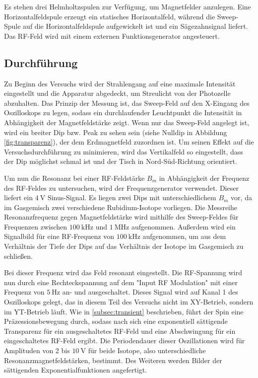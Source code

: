   Es stehen drei Helmholtzspulen zur Verfügung, um Magnetfelder anzulegen. Eine Horizontalfeldspule erzeugt ein statisches Horizontalfeld, während die Sweep-Spule auf die Horizontalfeldspule aufgewickelt ist und ein Sägezahnsignal liefert. Das RF-Feld wird mit einem externen Funktionsgenerator angesteuert.

  \subsection{Durchführung}

  Zu Beginn des Versuchs wird der Strahlengang auf eine maximale Intensität eingestellt und die Apparatur abgedeckt, um Streulicht von der Photozelle abzuhalten.
  Das Prinzip der Messung ist, das Sweep-Feld auf den X-Eingang des Oszilloskops zu legen, sodass ein durchlaufender Leuchtpunkt die Intensität in Abhängigkeit der Magnetfeldstärke zeigt.
  Wenn nur das Sweep-Feld angelegt ist, wird ein breiter Dip bzw. Peak zu sehen sein (siehe Nulldip in Abbildung \ref{fig:transparenz}), der dem Erdmagnetfeld zuzordnen ist. Um seinen Effekt auf die Versuchsdurchführung zu minimieren, wird das Vertikalfeld so eingestellt, dass der Dip möglichst schmal ist und der Tisch in Nord-Süd-Richtung orientiert.

  Um nun die Resonanz bei einer RF-Feldstärke $B_m$ in Abhängigkeit der Frequenz des RF-Feldes zu untersuchen, wird der Frequenzgenerator verwendet. Dieser liefert ein $\SI{4}{\volt}$ Sinus-Signal. Es liegen zwei Dips mit unterschiedlichem $B_m$ vor, da im Gasgemisch zwei verschiedene Rubidium-Isotope vorliegen. Die Messreihe Resonanzfrequenz gegen Magnetfeldstärke wird mithilfe des Sweep-Feldes für Frequenzen zwischen $\SI{100}{\kilo\hertz}$ und $\SI{1}{\mega\hertz}$ aufgenommen.
  Außerdem wird ein Signalbild für eine RF-Frequenz von $\SI{100}{\kilo\hertz}$ aufgenommen, um aus dem Verhältnis der Tiefe der Dips auf das Verhältnis der Isotope im Gasgemisch zu schließen.

  Bei dieser Frequenz wird das Feld resonant eingestellt. Die RF-Spannung wird nun durch eine Rechteckspannung auf dem "Input RF Modulation" mit einer Frequenz von $\SI{5}{\hertz}$ an- und ausgeschaltet. Dieses Signal wird auf Kanal 1 des Oszilloskops gelegt, das in diesem Teil des Versuchs nicht im XY-Betrieb, sondern im YT-Betrieb läuft. Wie in \ref{subsec:transient} beschrieben, führt der Spin eine Präzessionsbewegung durch, sodass nach sich eine exponentiell sättigende Transparenz für ein ausgeschaltetes RF-Feld und eine Abschwingung für ein eingeschaltetes RF-Feld ergibt. Die Periodendauer dieser Oszillationen wird für Amplituden von 2 bis $\SI{10}{\volt}$ für beide Isotope, also unterschiedliche Resonanzmagnetfeldstärken, bestimmt.
  Des Weiteren werden Bilder der sättigenden Exponentialfunktionen angefertigt.
